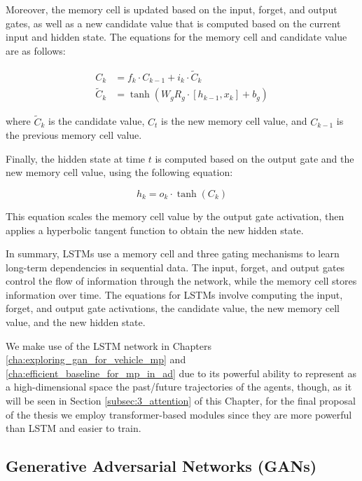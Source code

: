 Moreover, the memory cell is updated based on the input, forget, and output gates, as well as a new candidate value that is computed based on the current input and hidden state. The equations for the memory cell and candidate value are as follows:

\begin{equation}
\begin{split}
		C_k &= f_k \cdot C_{k-1} + i_k \cdot \tilde{C}_k \\
		\tilde{C}_k &= \tanh(W_g R_g \cdot [h_{k-1}, x_k] + b_g)
\end{split}
\end{equation}

where $\tilde{C}_k$ is the candidate value, $C_t$ is the new memory cell value, and $C_{k-1}$ is the previous memory cell value. 

Finally, the hidden state at time $t$ is computed based on the output gate and the new memory cell value, using the following equation:

\begin{equation}
	h_k = o_k \cdot \tanh(C_k)
\end{equation}

This equation scales the memory cell value by the output gate activation, then applies a hyperbolic tangent function to obtain the new hidden state.

In summary, \acp{LSTM} use a memory cell and three gating mechanisms to learn long-term dependencies in sequential data. The input, forget, and output gates control the flow of information through the network, while the memory cell stores information over time. The equations for \acp{LSTM} involve computing the input, forget, and output gate activations, the candidate value, the new memory cell value, and the new hidden state.

We make use of the \ac{LSTM} network in Chapters \ref{cha:exploring_gan_for_vehicle_mp} and \ref{cha:efficient_baseline_for_mp_in_ad} due to its powerful ability to represent as a high-dimensional space the past/future trajectories of the agents, though, as it will be seen in Section \ref{subsec:3_attention} of this Chapter, for the final proposal of the thesis we employ transformer-based modules since they are more powerful than \ac{LSTM} and easier to train.

\subsection{Generative Adversarial Networks (GANs)}
\label{subsec:3_gans}

